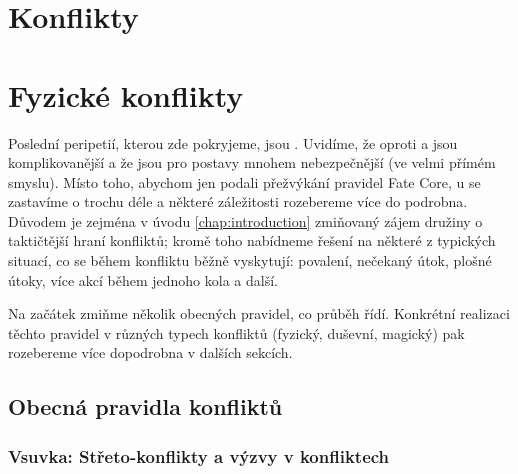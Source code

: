 \documentclass[../main.tex]{subfiles}
\begin{document}
\section{Konflikty}

\section{Fyzické konflikty}
\label{sec:boj}

Poslední peripetií, kterou zde pokryjeme, jsou . Uvidíme, že oproti  a  jsou komplikovanější a že jsou pro postavy mnohem nebezpečnější (ve velmi přímém smyslu). Místo toho, abychom jen podali přežvýkání pravidel Fate Core, u  se zastavíme o trochu déle a některé záležitosti rozebereme více do podrobna. Důvodem je zejména v úvodu \ref{chap:introduction} zmiňovaný zájem družiny o taktičtější hraní konfliktů; kromě toho nabídneme řešení na některé z typických situací, co se během konfliktu běžně vyskytují: povalení, nečekaný útok, plošné útoky, více akcí během jednoho kola a další.

Na začátek zmiňme několik obecných pravidel, co průběh  řídí. Konkrétní realizaci těchto pravidel v různých typech konfliktů (fyzický, duševní, magický) pak rozebereme více dopodrobna v dalších sekcích.

\subsection{Obecná pravidla konfliktů}
\label{sec:obecna-pravidla}

\subsubsection{Vsuvka: Střeto-konflikty a výzvy v konfliktech}
\label{sec:hybrid}
\end{document}
